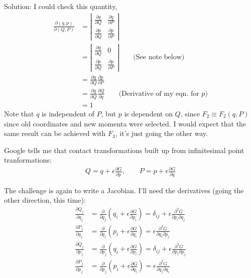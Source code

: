 \begin{homeworkProblem}
\begin{callout}{Solution:}
    I could check this quantity, 
    \begin{align*}
        \frac{\partial (q,p)}{\partial (Q,P)} &= \left|\begin{matrix} \frac{\partial q}{\partial Q} & \frac{\partial q}{\partial P} \\ \frac{\partial p}{\partial Q} & \frac{\partial p}{\partial P} \end{matrix}\right| \\
                                              &= \left|\begin{matrix} \frac{\partial q}{\partial Q} & 0 \\ \frac{\partial p}{\partial Q} & \frac{\partial p}{\partial P} \end{matrix}\right| \qquad \text{(See note below)} \\
        &= \frac{\partial q}{\partial Q} \frac{\partial p}{\partial P} \\ 
        &= \frac{\partial q}{\partial Q} \frac{\partial Q}{\partial q} \qquad\text{(Derivative of my eqn. for $p$)} \\ 
        &= 1
    \end{align*}
    Note that $q$ is independent of $P$, but $p$ is dependent on $Q$, since $F_{2}\equiv F_{2}(q,P)$ since old coordinates and new momenta were selected. I would expect that the same result can be achieved with $F_{3}$, it's just going the other way.

    Google tells me that contact transformations built up from infinitesimal point tranformations:
    \begin{align*}
        Q = q + \epsilon \frac{\partial G}{\partial p}, \qquad P = p + \epsilon \frac{\partial G}{\partial q}
    \end{align*}

    The challenge is again to write a Jacobian. I'll need the derivatives (going the other direction, this time):
    \begin{align*}
        \frac{\partial Q_j}{\partial q_j} &= \frac{\partial}{\partial q_j} \left( q_i  + \epsilon \frac{\partial G}{\partial p_i} \right) = 
        \delta_{ij} + \epsilon \frac{\partial^{2}G}{\partial p_i \partial q_j} 
        \\
        \frac{\partial P_j}{\partial q_j} &= \frac{\partial}{\partial q_j} \left( p_i  + \epsilon \frac{\partial G}{\partial q_i} \right) = 
        \epsilon \frac{\partial^{2}G}{\partial q_i \partial p_j} 
        \\
        \frac{\partial Q_j}{\partial p_j} &= \frac{\partial}{\partial p_j} \left( q_i  + \epsilon \frac{\partial G}{\partial p_i} \right) = 
        \delta_{ij} + \epsilon \frac{\partial^{2}G}{\partial p_i \partial p_j} 
        \\
        \frac{\partial P_j}{\partial p_j} &= \frac{\partial}{\partial p_j} \left( p_i  + \epsilon \frac{\partial G}{\partial q_i} \right) = 
        \epsilon \frac{\partial^{2}G}{\partial q_j \partial q_i} 
        \\
    \end{align*}


\end{callout}
\end{homeworkProblem}
